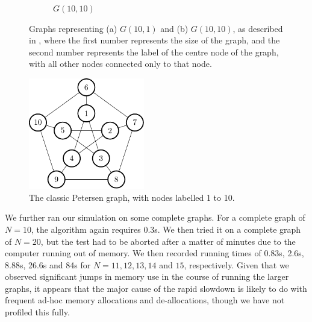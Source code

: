 \begin{figure}
\begin{subfigure}[b]{0.35\textwidth}
        \caption{\label{fig:gcol:g-10-10}\(G(10,10)\)}
    \end{subfigure}
    \caption[Graphs representing \(G(10,1)\) and \(G(10,10)\)]{\label{fig:gcol:gs}Graphs representing (a) \(G(10,1)\) and (b) \(G(10,10)\), as described in \cite{Gheorghe2013}, where the first number represents the size of the graph, and the second number represents the label of the centre node of the graph, with all other nodes connected only to that node.}
\end{figure}

\begin{figure}
    \centering
    \includegraphics[width=0.45\textwidth]{chapters/gcol/figs/petersen-figure0.pdf}
    \caption{\label{fig:gcol:petersen}The classic Petersen graph, with nodes labelled 1 to 10.}
\end{figure}

We further ran our simulation on some complete graphs.  For a complete graph of \(N = 10\), the algorithm again requires 0.3s.  We then tried it on a complete graph of \(N = 20\), but the test had to be aborted after a matter of minutes due to the computer running out of memory.  We then recorded running times of 0.83s, 2.6s, 8.88s, 26.6s and 84s for \(N = 11, 12, 13, 14\) and \(15\), respectively.  Given that we observed significant jumps in memory use in the course of running the larger graphs, it appears that the major cause of the rapid slowdown is likely to do with frequent ad-hoc memory allocations and de-allocations, though we have not profiled this fully.


